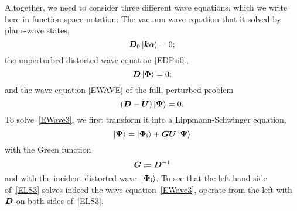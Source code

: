 Altogether, we need to consider three different wave equations,
which we write here in function-space notation:
The vacuum wave equation that it solved by plane-wave states,
\begin{equation}\label{EWave1}
  \TDo \ket\ka = 0;
\end{equation}
the unperturbed distorted-wave equation \cref{EDPsi0},
\begin{equation}\label{EWave2}
  \TD\ket{\v\Phi} = 0;
\end{equation}
and the wave equation \cref{EWAVE} of the full, perturbed problem
\begin{equation}\label{EWave3}
  (\TD-\TU)\ket{\v\Psi} = 0.
\end{equation}
To solve~\cref{EWave3},
we first transform it into a Lippmann-Schwinger equation,
%
\begin{equation}\label{ELS3}
   \ket{\v\Psi} = \ket{\v\Phi_\si} + \TG\TU\ket{\v\Psi}
\end{equation}
with the Green function
%
%
\begin{equation}\label{EdefG}
   \TG \coloneqq \TD^{-1}
\end{equation}
and with the incident distorted wave~$\ket{\bm{\Phi}_{\text{i}}}$.
To see that the left-hand side of~\cref{ELS3}
solves indeed the wave equation~\cref{EWave3},
operate from the left with~$\bm{D}$ on both sides of~\cref{ELS3}.

